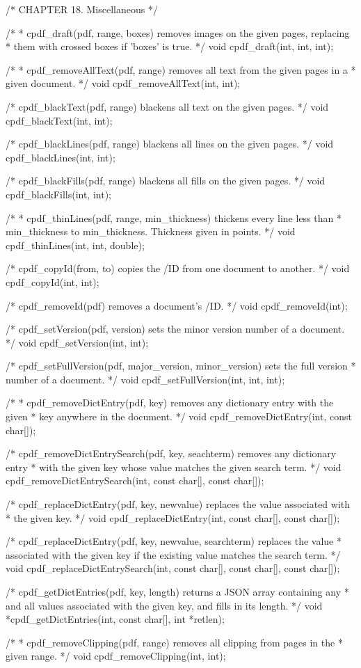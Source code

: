 /* CHAPTER 18. Miscellaneous */

/*
 * cpdf_draft(pdf, range, boxes) removes images on the given pages, replacing
 * them with crossed boxes if 'boxes' is true.
 */
void cpdf_draft(int, int, int);

/*
 * cpdf_removeAllText(pdf, range) removes all text from the given pages in a
 * given document.
 */
void cpdf_removeAllText(int, int);

/* cpdf_blackText(pdf, range) blackens all text on the given pages. */
void cpdf_blackText(int, int);

/* cpdf_blackLines(pdf, range) blackens all lines on the given pages. */
void cpdf_blackLines(int, int);

/* cpdf_blackFills(pdf, range) blackens all fills on the given pages. */
void cpdf_blackFills(int, int);

/*
 * cpdf_thinLines(pdf, range, min_thickness) thickens every line less than
 * min_thickness to min_thickness. Thickness given in points.
 */
void cpdf_thinLines(int, int, double);

/* cpdf_copyId(from, to) copies the /ID from one document to another. */
void cpdf_copyId(int, int);

/* cpdf_removeId(pdf) removes a document's /ID. */
void cpdf_removeId(int);

/* cpdf_setVersion(pdf, version) sets the minor version number of a document. */
void cpdf_setVersion(int, int);

/* cpdf_setFullVersion(pdf, major_version, minor_version) sets the full version
 * number of a document. */
void cpdf_setFullVersion(int, int, int);

/*
 * cpdf_removeDictEntry(pdf, key) removes any dictionary entry with the given
 * key anywhere in the document.
 */
void cpdf_removeDictEntry(int, const char[]);

/* cpdf_removeDictEntrySearch(pdf, key, seachterm) removes any dictionary entry
 * with the given key whose value matches the given search term. */
void cpdf_removeDictEntrySearch(int, const char[], const char[]);

/* cpdf_replaceDictEntry(pdf, key, newvalue) replaces the value associated with
 * the given key. */
void cpdf_replaceDictEntry(int, const char[], const char[]);

/* cpdf_replaceDictEntry(pdf, key, newvalue, searchterm) replaces the value
 * associated with the given key if the existing value matches the search term.
 */
void cpdf_replaceDictEntrySearch(int, const char[], const char[], const char[]);

/* cpdf_getDictEntries(pdf, key, length) returns a JSON array containing any
 * and all values associated with the given key, and fills in its length. */
void *cpdf_getDictEntries(int, const char[], int *retlen);

/*
 * cpdf_removeClipping(pdf, range) removes all clipping from pages in the
 * given range.
 */
void cpdf_removeClipping(int, int);
